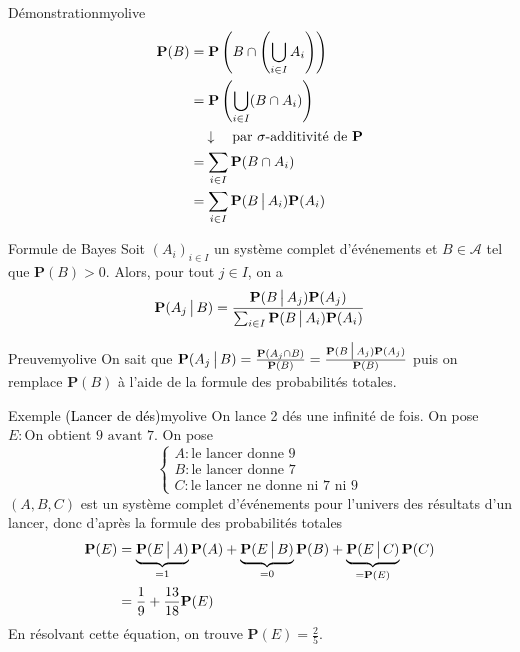     \begin{demo}{Démonstration}{myolive}
        \begin{align*}
            \mathbf{P}(B) 
            &= \mathbf{P}\left(B \cap \left(\bigcup_{i \in I} A_i\right)\right) \\
            &= \mathbf{P}\left(\bigcup_{i \in I} (B \cap A_i)\right) \\
            &\quad \downarrow \quad \text{par } \sigma\text{-additivité de } \mathbf{P} \\
            &= \sum_{i \in I} \mathbf{P}(B \cap A_i) \\
            &= \sum_{i \in I} \mathbf{P}(B \, \big| \, A_i) \mathbf{P}(A_i)
        \end{align*}
    \end{demo}

    \begin{prop}{Formule de Bayes}{}
        Soit $(A_i)_{i \in I}$ un système complet d’événements et $B \in \mathcal{A}$ tel que $\mathbf{P}(B) > 0$. Alors, pour tout $j \in I$, on a 
        \[ \mathbf{P}(A_j \, \big| \, B) = \frac{\mathbf{P}(B \, \big| \, A_j) \mathbf{P}(A_j)}{\sum_{i \in I} \mathbf{P}(B \, \big| \, A_i) \mathbf{P}(A_i)} \]    
    \end{prop}

    \begin{demo}{Preuve}{myolive}
        On sait que $\mathbf{P}(A_j \, \big| \, B) = \frac{\mathbf{P}(A_j \cap B)}{\mathbf{P}(B)} = \frac{\mathbf{P}(B \, \big| \, A_j)\mathbf{P}(A_j)}{\mathbf{P}(B)}$ puis on remplace $\mathbf{P}(B)$ à l’aide de la formule des probabilités totales.
    \end{demo}

    \begin{omed}{Exemple \textcolor{black}{(Lancer de dés)}}{myolive}
        On lance 2 dés une infinité de fois. On pose $E : \text{On obtient 9 avant 7}$. On pose 
        \[ \left\{ \begin{array}{l}
            A : \text{le lancer donne 9} \\
            B : \text{le lancer donne 7} \\
            C : \text{le lancer ne donne ni 7 ni 9}
        \end{array} \right. \]
        $(A, B, C)$ est un système complet d’événements pour l’univers des résultats d’un lancer, donc d’après la formule des probabilités totales 
        \begin{align*}
            \mathbf{P}(E) 
            &= \underbrace{\mathbf{P}(E \, \big| \, A)}_{= 1} \mathbf{P}(A) + \underbrace{\mathbf{P}(E \, \big| \, B)}_{= 0} \mathbf{P}(B) + \underbrace{\mathbf{P}(E \, \big| \, C)}_{= \mathbf{P}(E)} \mathbf{P}(C) \\
            &= \frac{1}{9} + \frac{13}{18} \mathbf{P}(E) 
        \end{align*}
        En résolvant cette équation, on trouve $\mathbf{P}(E) = \frac{2}{5}$.
    \end{omed}

